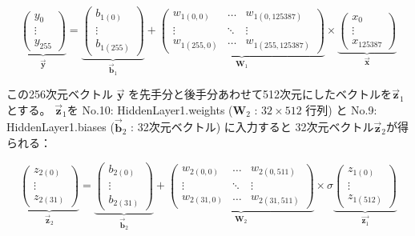 \documentclass[11pt,a4paper]{ltjsarticle}
\begin{document}
\[
  \underbrace{\left(
    \begin{array}{c}
      y_{0}   \\
      \vdots    \\
      y_{255} 
    \end{array}  
  \right)}_{\vec{\bm{y}}}
  =
  \underbrace{\left(
    \begin{array}{c}
      b_{1(0)}   \\
      \vdots    \\
      b_{1(255)} 
    \end{array}  
  \right)}_{\vec{\bm{b}}_1}
  +
  \underbrace{\left(
    \begin{array}{ccc}
      w_{1(0,0)}   & \ldots & w_{1(0,125387)} \\
      \vdots    & \ddots & \vdots \\
      w_{1(255,0)} & \ldots & w_{1(255,125387)}
    \end{array}
  \right)}_{\bm{W}_1}
  \times
  \underbrace{\left(
    \begin{array}{c}
      x_{0}   \\
      \vdots    \\
      x_{125387} 
    \end{array}  
  \right)}_{\vec{\bm{x}}}
\]

\noindent
この256次元ベクトル $\vec{\bm{y}}$ を先手分と後手分あわせて512次元にしたベクトルを$\vec{\bm{z}}_1$とする。
$\vec{\bm{z}}_1$を
No.10: HiddenLayer1.weights ($\bm{W}_2$ : $32 \times 512$ 行列) と
No.9: HiddenLayer1.biases ($\vec{\bm{b}}_2$ : 32次元ベクトル) に入力すると
32次元ベクトル$\vec{\bm{z}}_2$が得られる：

\[
  \underbrace{\left(
    \begin{array}{c}
      z_{2(0)}   \\
      \vdots    \\
      z_{2(31)} 
    \end{array}  
  \right)}_{\vec{\bm{z}}_2}
  =
  \underbrace{\left(
    \begin{array}{c}
      b_{2(0)}   \\
      \vdots    \\
      b_{2(31)} 
    \end{array}  
  \right)}_{\vec{\bm{b}}_2}
  +
  \underbrace{\left(
    \begin{array}{ccc}
      w_{2(0,0)}   & \ldots & w_{2(0,511)} \\
      \vdots    & \ddots & \vdots \\
      w_{2(31,0)} & \ldots & w_{2(31,511)}
    \end{array}
  \right)}_{\bm{W}_2}
  \times
  \sigma 
  \underbrace{\left(
    \begin{array}{c}
      z_{1(0)}   \\
      \vdots    \\
      z_{1(512)} 
    \end{array}  
  \right)}_{\vec{\bm{z}_1}}
\]
\end{document}
